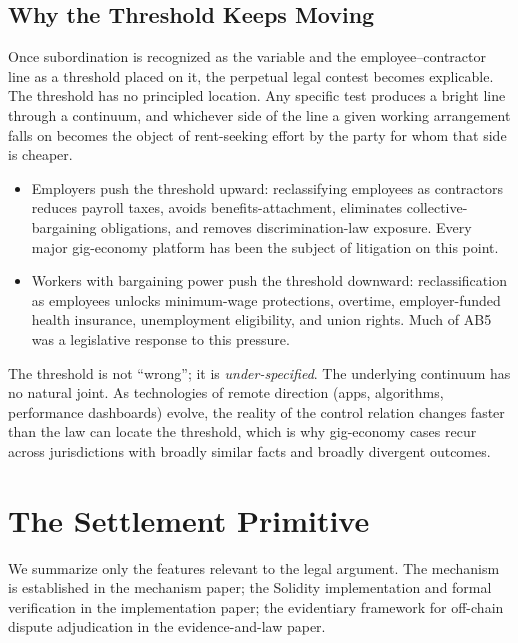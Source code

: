 \documentclass[11pt,a4paper]{article}
\theoremstyle{remark}
\begin{document}
\subsection{Why the Threshold Keeps Moving}

Once subordination is recognized as the variable and the
employee--contractor line as a threshold placed on it, the
perpetual legal contest becomes explicable. The threshold has no
principled location. Any specific test produces a bright line
through a continuum, and whichever side of the line a given
working arrangement falls on becomes the object of rent-seeking
effort by the party for whom that side is cheaper.

\begin{itemize}
  \item Employers push the threshold upward: reclassifying employees
    as contractors reduces payroll taxes, avoids
    benefits-attachment, eliminates collective-bargaining
    obligations, and removes discrimination-law exposure. Every
    major gig-economy platform has been the subject of litigation
    on this point.
  \item Workers with bargaining power push the threshold downward:
    reclassification as employees unlocks minimum-wage
    protections, overtime, employer-funded health insurance,
    unemployment eligibility, and union rights. Much of AB5 was a
    legislative response to this pressure.
\end{itemize}

The threshold is not ``wrong''; it is \emph{under-specified}. The
underlying continuum has no natural joint. As technologies of
remote direction (apps, algorithms, performance dashboards)
evolve, the reality of the control relation changes faster than
the law can locate the threshold, which is why gig-economy cases
recur across jurisdictions with broadly similar facts and broadly
divergent outcomes.

\section{The Settlement Primitive}
\label{sec:primitive}

We summarize only the features relevant to the legal argument. The
mechanism is established in the mechanism paper; the
Solidity implementation and formal verification
in the implementation paper; the evidentiary framework for off-chain
dispute adjudication in the evidence-and-law paper.
\end{document}

